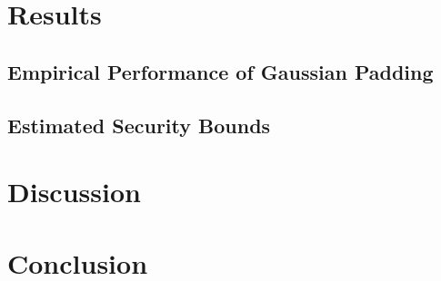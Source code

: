 \documentclass[
	ruledheaders=chapter,
	class=report,
	thesis={type=master, department=inf},
	accentcolor=1c,
	custommargins=true,
	marginpar=false,
	parskip=half-,
	fontsize=11pt,
]{tudapub}
\begin{document}
	\chapter{Results}
	\label{results}

	\section{Empirical Performance of Gaussian Padding}
	\label{performance}

	\section{Estimated Security Bounds}
	\label{security_bounds}

	\chapter{Discussion}
	\label{discussion}

	\chapter{Conclusion}
	\label{conclusion}

	\pagebreak
	\setcounter{page}{5}
	\printbibliography

	\cleardoublepage
	\listoffigures

	\cleardoublepage
	\listoftables
\end{document}
